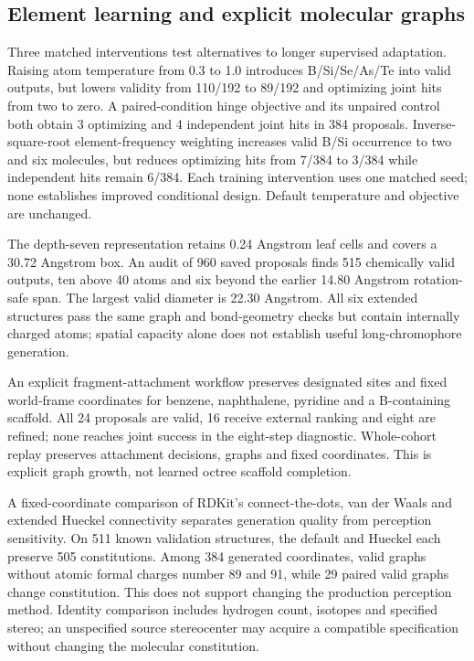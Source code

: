 \documentclass[11pt,a4paper]{article}
\begin{document}
\FloatBarrier
\subsection{Element learning and explicit molecular
graphs}\label{element-learning-and-explicit-molecular-graphs}

Three matched interventions test alternatives to longer supervised
adaptation. Raising atom temperature from 0.3 to 1.0 introduces
B/Si/Se/As/Te into valid outputs, but lowers validity from 110/192 to
89/192 and optimizing joint hits from two to zero. A paired-condition
hinge objective and its unpaired control both obtain 3 optimizing and 4
independent joint hits in 384 proposals. Inverse- square-root
element-frequency weighting increases valid B/Si occurrence to two and
six molecules, but reduces optimizing hits from 7/384 to 3/384 while
independent hits remain 6/384. Each training intervention uses one
matched seed; none establishes improved conditional design. Default
temperature and objective are unchanged.

The depth-seven representation retains 0.24 Angstrom leaf cells and
covers a 30.72 Angstrom box. An audit of 960 saved proposals finds 515
chemically valid outputs, ten above 40 atoms and six beyond the earlier
14.80 Angstrom rotation-safe span. The largest valid diameter is 22.30
Angstrom. All six extended structures pass the same graph and
bond-geometry checks but contain internally charged atoms; spatial
capacity alone does not establish useful long-chromophore generation.

An explicit fragment-attachment workflow preserves designated sites and
fixed world-frame coordinates for benzene, naphthalene, pyridine and a
B-containing scaffold. All 24 proposals are valid, 16 receive external
ranking and eight are refined; none reaches joint success in the
eight-step diagnostic. Whole-cohort replay preserves attachment
decisions, graphs and fixed coordinates. This is explicit graph growth,
not learned octree scaffold completion.

A fixed-coordinate comparison of RDKit's connect-the-dots, van der Waals
and extended Hueckel connectivity \citep{rdkit2026bonds} separates
generation quality from perception sensitivity. On 511 known validation
structures, the default and Hueckel each preserve 505 constitutions.
Among 384 generated coordinates, valid graphs without atomic formal
charges number 89 and 91, while 29 paired valid graphs change
constitution. This does not support changing the production perception
method. Identity comparison includes hydrogen count, isotopes and
specified stereo; an unspecified source stereocenter may acquire a
compatible specification without changing the molecular constitution.
\end{document}
